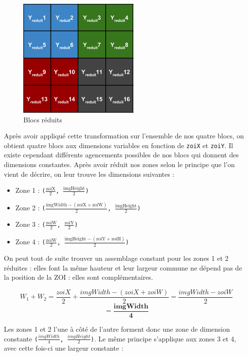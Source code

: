 \documentclass[11pt,a4paper]{article}
\begin{document}
\begin{figure}[H]
\begin{center}
\includegraphics[scale=0.5]{images/yuv4.png}
\end{center}
\caption{Blocs réduits}
\label{}
\end{figure}

\bigbreak
Après avoir appliqué cette transformation sur l'ensemble de nos quatre blocs, on obtient quatre blocs aux dimensions variables en fonction de \texttt{zoiX} et \texttt{zoiY}.
Il existe cependant différents agencements possibles de nos blocs qui donnent des dimensions constantes.
Après avoir réduit nos zones selon le principe que l'on vient de décrire, on leur trouve les dimensions suivantes :

\bigbreak
\begin{itemize}
\item{Zone 1 : \texttt{($\frac{\text{zoiX}}{2}$, $\frac{\text{imgHeight}}{2}$)}}
\item{Zone 2 : \texttt{($\frac{\text{imgWidth}-(\text{zoiX}+\text{zoiW})}{2}$, $\frac{\text{imgHeight}}{2}$)}}
\item{Zone 3 : \texttt{($\frac{\text{zoiW}}{2}$, $\frac{\text{zoiY}}{2}$)}}
\item{Zone 4 : \texttt{($\frac{\text{zoiW}}{2}$, $\frac{\text{imgHeight}-(\text{zoiY}+\text{zoiH})}{2}$)}}
\end{itemize}

\bigbreak
On peut tout de suite trouver un assemblage constant pour les zones 1 et 2 réduites : elles font la même hauteur et leur largeur commune ne dépend pas de la position de la ZOI : elles sont complémentaires.

$$ W_1 + W_2 = \frac{zoiX}{2} + \frac{imgWidth-(zoiX+zoiW)}{2} = \frac{imgWidth - zoiW}{2}$$
$$ = \mathbf{\frac{imgWidth}{4}} $$

\bigbreak
Les zones 1 et 2 l'une à côté de l'autre forment donc une zone de dimension constante \texttt{($\frac{imgWidth}{4}$, $\frac{imgHeight}{2}$)}.
Le même principe s'applique aux zones 3 et 4, avec cette fois-ci une largeur constante :
\end{document}

